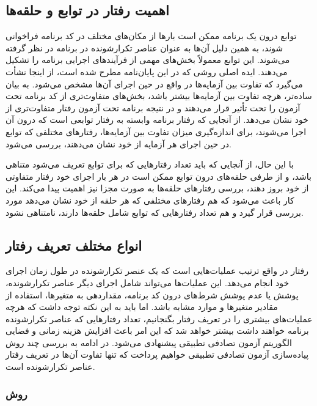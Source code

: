 \subsection{اهمیت رفتار در توابع و حلقه‌ها}

توابع درون یک برنامه ممکن است بارها از مکان‌های مختلف در کد برنامه فراخوانی شوند، به همین دلیل آن‌ها به عنوان عناصر تکرارشونده در برنامه در نظر گرفته می‌شوند. این توابع معمولاً بخش‌های مهمی از فرآیندهای اجرایی برنامه را تشکیل می‌دهند. ایده اصلی روشی که در این پایان‌نامه مطرح شده است، از اینجا نشأت می‌گیرد که تفاوت بین آزمایه‌ها در واقع در حین اجرای آن‌ها مشخص می‌شود. به بیان ساده‌تر، هرچه تفاوت بین آزمایه‌ها بیشتر باشد، بخش‌های متفاوت‌تری از کد برنامه تحت آزمون را تحت تأثیر قرار می‌دهند و در نتیجه برنامه تحت آزمون رفتار متفاوت‌تری از خود نشان می‌دهد. از آنجایی که رفتار برنامه وابسته به رفتار توابعی است که درون آن اجرا می‌شوند، برای اندازه‌گیری میزان تفاوت بین آزمایه‌ها، رفتارهای مختلفی که توابع در حین اجرای هر آزمایه از خود نشان می‌دهند، بررسی می‌شود.

با این حال، از آنجایی که باید تعداد رفتارهایی که برای توابع تعریف می‌شود متناهی باشد، و از طرفی حلقه‌های درون توابع ممکن است در هر بار اجرای خود رفتار متفاوتی از خود بروز دهند، بررسی رفتارهای حلقه‌ها به صورت مجزا نیز اهمیت پیدا می‌کند. این کار باعث می‌شود که هم رفتارهای مختلفی که هر حلقه از خود نشان می‌دهد مورد بررسی قرار گیرد و هم تعداد رفتارهایی که توابع شامل حلقه‌ها دارند، نامتناهی نشود.

\subsection{انواع مختلف تعریف رفتار}

رفتار در واقع ترتیب عملیات‌هایی است که یک عنصر تکرارشونده در طول زمان اجرای خود انجام می‌دهد. این عملیات‌ها می‌تواند شامل اجرای دیگر عناصر تکرارشونده، پوشش یا عدم پوشش شرط‌های درون کد برنامه، مقداردهی به متغیرها، استفاده از مقادیر متغیرها و موارد مشابه باشد. اما باید به این نکته توجه داشت که هرچه عملیات‌های بیشتری را در تعریف رفتار بگنجانیم، تعداد رفتارهایی که عناصر تکرارشونده برنامه خواهند داشت بیشتر خواهد شد که این امر باعث افزایش هزینه زمانی و فضایی الگوریتم آزمون تصادفی تطبیقی پیشنهادی می‌شود. در ادامه به بررسی چند روش پیاده‌سازی آزمون تصادفی تطبیقی خواهیم پرداخت که تنها تفاوت آن‌ها در تعریف رفتار عناصر تکرارشونده است.

\subsubsection{روش }

